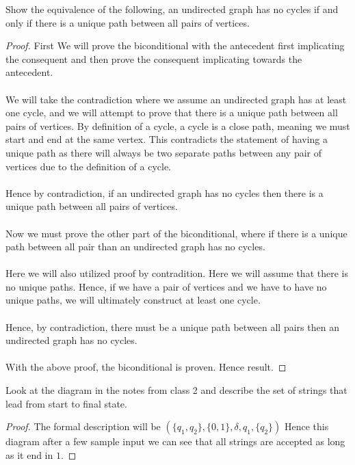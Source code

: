 \documentclass[12pt]{article}
\newenvironment{exercise}[2][Exercise]{\begin{trivlist}
\item[\hskip \labelsep {\bfseries #1}\hskip \labelsep {\bfseries #2.}]}{\end{trivlist}}
\begin{document}
\begin{exercise}{2}
Show the equivalence of the following, an undirected graph has no cycles if and only if there is a unique path between all pairs of vertices.
\end{exercise}
 
\begin{proof}
First We will prove the biconditional with the antecedent first implicating the consequent and then prove the consequent implicating towards the antecedent. \\ \\
We will take the contradiction where we assume an undirected graph has at least one cycle, and we will attempt to prove that there is a unique path between all pairs of vertices. By definition of a cycle, a cycle is a close path, meaning we must start and end at the same vertex. This contradicts the statement of having a unique path as there will always be two separate paths between any pair of vertices due to the definition of a cycle. \\ \\ 
Hence by contradiction, if an undirected graph has no cycles then there is a unique path between all pairs of vertices. \\ \\
Now we must prove the other part of the biconditional, where if there is a unique path between all pair than an undirected graph has no cycles. \\ \\
Here we will also utilized proof by contradition. Here we will assume that there is no unique paths. Hence, if we have a pair of vertices and we have to have no unique paths, we will ultimately construct at least one cycle. \\ \\ 
Hence, by contradiction, there must be a unique path between all pairs then an undirected graph has no cycles. \\ \\
With the above proof, the biconditional is proven. Hence result.

\end{proof}

\begin{exercise}{3}
Look at the diagram in the notes from class 2 and describe the set of strings that lead from start to final state. 
\end{exercise}

\begin{proof}
The formal description will be $(\{q_{1},q_{2}\},\{0,1\},\delta,q_{1},\{q_{2}\})$ Hence this diagram after a few sample input we can see that all strings are accepted as long as it end in $1$.

\end{proof}
 
\end{document}

